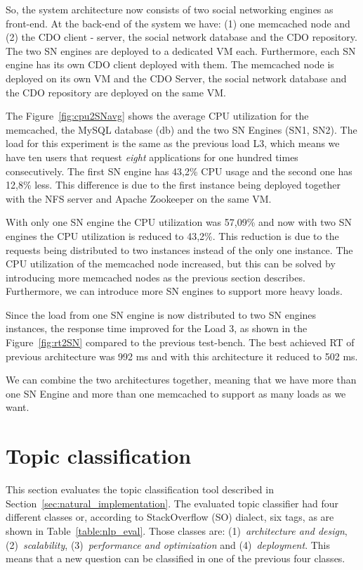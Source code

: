 So, the system architecture now consists of two social networking engines as front-end. At the back-end of the system we have: (1) one memcached node and (2) the CDO client - server, the social network database and the CDO repository. The two SN engines are deployed to a dedicated VM each. Furthermore, each SN engine has its own CDO client deployed with them. The memcached node is deployed on its own VM and the CDO Server, the social network database and the CDO repository are deployed on the same VM.

The Figure~\ref{fig:cpu2SNavg} shows the average CPU utilization for the memcached, the MySQL database (db) and the two SN Engines (SN1, SN2). The load for this experiment is the same as the previous load L3, which means we have ten users that request \emph{eight} applications for one hundred times consecutively. The first SN engine has 43,2\% CPU usage and the second one has 12,8\% less. This difference is due to the first instance being deployed together with the NFS server and Apache Zookeeper on the same VM. 

With only one SN engine the CPU utilization was 57,09\% and now with two SN engines the CPU utilization is reduced to 43,2\%. This reduction is due to the requests being distributed to two instances instead of the only one instance. The CPU utilization of the memcached node increased, but this can be solved by introducing more memcached nodes as the previous section describes. Furthermore, we can introduce more SN engines to support more heavy loads.

Since the load from one SN engine is now distributed to two SN engines instances, the response time improved for the Load 3, as shown in the Figure~\ref{fig:rt2SN} compared to the previous test-bench. The best achieved RT of previous architecture was 992 ms and with this architecture it reduced to 502 ms.

We can combine the two architectures together, meaning that we have more than one SN Engine and more than one memcached to support as many loads as we want.

\section{Topic classification}
\label{sec:nlp_evaluation}
This section evaluates the topic classification tool described in Section~\ref{sec:natural_implementation}. The evaluated topic classifier had four different classes or, according to StackOverflow (SO) dialect, six tags, as are shown in Table~\ref{table:nlp_eval}. Those classes are: (1)~\emph{architecture and design}, (2)~\emph{scalability}, (3)~\emph{performance and optimization} and (4)~\emph{deployment}. This means that a new question can be classified in one of the previous four classes.

